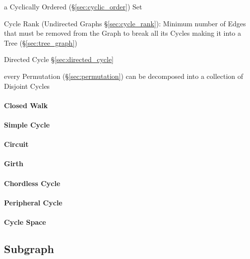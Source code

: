 a Cyclically Ordered (\S\ref{sec:cyclic_order}) Set

\fist Cycle Rank (Undirected Graphs \S\ref{sec:cycle_rank}): Minimum number of
Edges that must be removed from the Graph to break all its Cycles making it
into a Tree (\S\ref{sec:tree_graph})

Directed Cycle \S\ref{sec:directed_cycle}

every Permutation (\S\ref{sec:permutation}) can be decomposed into a collection
of Disjoint Cycles



\paragraph{Closed Walk}\label{sec:closed_walk}\hfill

\paragraph{Simple Cycle}\label{sec:simple_cycle}\hfill

\paragraph{Circuit}\label{sec:circuit}\hfill

\paragraph{Girth}\label{sec:girth}\hfill

\paragraph{Chordless Cycle}\label{sec:chordless_cycle}\hfill

\paragraph{Peripheral Cycle}\label{sec:peripheral_cycle}\hfill

\paragraph{Cycle Space}\label{sec:cycle_space}\hfill



\subsection{Subgraph}\label{sec:subgraph}

